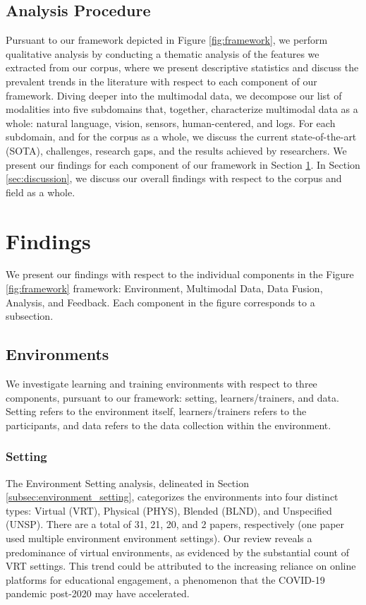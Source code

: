 \documentclass[manuscript,screen,review]{acmart}
\begin{document}
\subsection{Analysis Procedure} \label{subsec:analysis_procedure}

Pursuant to our framework depicted in Figure \ref{fig:framework}, we perform qualitative analysis by conducting a thematic analysis of the features we extracted from our corpus, where we present descriptive statistics and discuss the prevalent trends in the literature with respect to each component of our framework. Diving deeper into the multimodal data, we decompose our list of modalities into five subdomains that, together, characterize multimodal data as a whole: natural language, vision, sensors, human-centered, and logs. For each subdomain, and for the corpus as a whole, we discuss the current state-of-the-art (SOTA), challenges, research gaps, and the results achieved by researchers. We present our findings for each component of our framework in Section \ref{sec:findings}. In Section \ref{sec:discussion}, we discuss our overall findings with respect to the corpus and field as a whole.

\section{Findings}\label{sec:findings}
We present our findings with respect to the individual components in the Figure \ref{fig:framework} framework: Environment, Multimodal Data, Data Fusion, Analysis, and Feedback. Each component in the figure corresponds to a subsection.

\subsection{Environments}
We investigate learning and training environments with respect to three components, pursuant to our framework: setting, learners/trainers, and data. Setting refers to the environment itself, learners/trainers refers to the participants, and data refers to the data collection within the environment.

\subsubsection{Setting}


The Environment Setting analysis, delineated in Section \ref{subsec:environment_setting}, categorizes the environments into four distinct types: Virtual (VRT), Physical (PHYS), Blended (BLND), and Unspecified (UNSP). There are a total of 31, 21, 20, and 2 papers, respectively (one paper \cite{3637456466} used multiple environment environment settings). Our review reveals a predominance of virtual environments, as evidenced by the substantial count of VRT settings. This trend could be attributed to the increasing reliance on online platforms for educational engagement, a phenomenon that the COVID-19 pandemic post-2020 may have accelerated.
\end{document}
